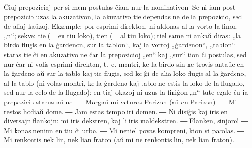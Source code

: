 
Ĉiuj prepozicioj per si mem postulas ĉiam nur la nominativon. Se ni iam post prepozicio uzas la akuzativon, la akuzativo tie dependas ne de la prepozicio, sed de aliaj kaŭzoj. Ekzemple: por esprimi direkton, ni aldonas al la vorto la finon „n“; sekve: tie (= en tiu loko), tien (= al tiu loko); tiel same ni ankaŭ diras: „la birdo flugis en la ĝardenon, sur la tablon“, kaj la vortoj „ĝardenon“, „tablon“ staras tie ĉi en akuzativo ne ĉar la prepozicioj „en“ kaj „sur“ tion ĉi postulas, sed nur ĉar ni volis esprimi direkton, t.~e. montri, ke la birdo sin ne trovis antaŭe en la ĝardeno aŭ sur la tablo kaj tie flugis, sed ke ĝi de alia loko flugis al la ĝardeno, al la tablo (ni volas montri, ke la ĝardeno kaj tablo ne estis la loko de la flugado, sed nur la celo de la flugado); en tiaj okazoj ni uzus la finiĝon „n“ tute egale\unuakomon{} ĉu ia prepozicio starus aŭ ne. ― Morgaŭ mi veturos Parizon (aŭ en Parizon). ― Mi restos hodiaŭ dome. ― Jam estas tempo iri domen. ― Ni disiĝis kaj iris en diversajn flankojn: mi iris dekstren, kaj li iris maldekstren. ― Flanken, sinjoro! ― Mi konas neniun en tiu ĉi urbo. ― Mi neniel povas kompreni, kion vi parolas. ― Mi renkontis nek lin, nek lian fraton (aŭ mi ne renkontis lin, nek lian fraton).

